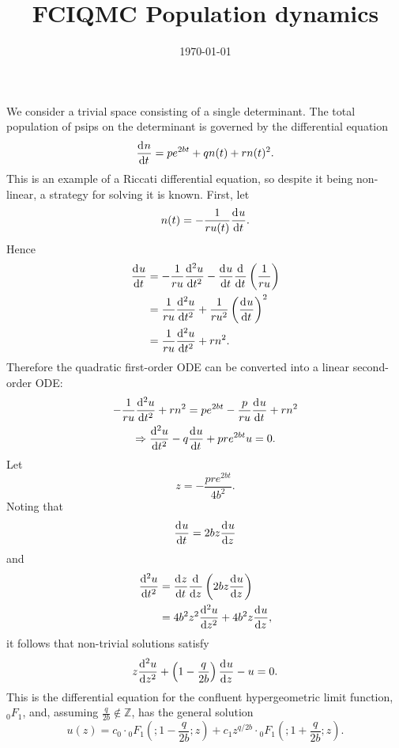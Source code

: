 \documentclass[a4paper, 11pt]{article}
\newcommand{\dd}[3][\null]{\frac{\mathrm{d}^{#1}{#2}}{\mathrm{d}{#3}^{#1}}}
\newcommand{\hyperF}[2]{{_0}F_1\left(;#1;#2\right)}
\begin{document}
\title{FCIQMC Population dynamics} 
\date{\today} \maketitle

We consider a trivial space consisting of a single determinant.  The total population of psips on the determinant is governed by the differential equation
\begin{equation}
\dd{n}{t} = p e^{2bt} + q n(t) + r n(t)^2. \label{eqn:dynamics}
\end{equation}
This is an example of a Riccati differential equation, so despite it being non-linear, a strategy for solving it is known.  First, let
\begin{equation}
n(t) = - \frac{1}{r u(t)} \dd{u}{t}.
\end{equation}
Hence
\begin{align}
\dd{u}{t} &= -\frac{1}{r u} \dd[2]{u}{t} - \dd{u}{t}\dd{\null}{t}\left(\frac{1}{r u}\right) \\
          &= \frac{1}{r u} \dd[2]{u}{t} + \frac{1}{r u^2} \left(\dd{u}{t}\right)^2 \\
          &= \frac{1}{r u} \dd[2]{u}{t} + r n^2.
\end{align}
Therefore the quadratic first-order ODE can be converted into a linear second-order ODE:
\begin{gather}
- \frac{1}{r u} \dd[2]{u}{t} + r n^2 = p e^{2bt} - \frac{p}{ru} \dd{u}{t} + rn^2 \\
\Rightarrow \dd[2]{u}{t} - q\dd{u}{t} + pre^{2bt} u = 0.
\end{gather}
Let
\begin{equation}
z = -\frac{pre^{2bt}}{4b^2}.
\end{equation}
Noting that
\begin{equation}
\dd{u}{t} = 2bz \dd{u}{z}
\end{equation}
and
\begin{align}
\dd[2]{u}{t} &= \dd{z}{t} \dd{\null}{z}\left(2bz\dd{u}{z}\right) \\
             &= 4 b^2 z^2 \dd[2]{u}{z} + 4 b^2 z \dd{u}{z},
\end{align}
it follows that non-trivial solutions satisfy
\begin{equation}
z \dd[2]{u}{z} + \left(1-\frac{q}{2b}\right)\dd{u}{z} - u = 0. \label{eqn:hyperf_ode}
\end{equation}
This is the differential equation for the confluent hypergeometric limit function, ${_0}F_1$, and, assuming $\frac{q}{2b}\notin\mathbb{Z}$, has the general solution
\begin{equation}
u(z) = c_0\cdot\hyperF{1-\frac{q}{2b}}{z} + c_1 z^{q/2b}\cdot\hyperF{1+\frac{q}{2b}}{z}.
\end{equation}
\end{document}
